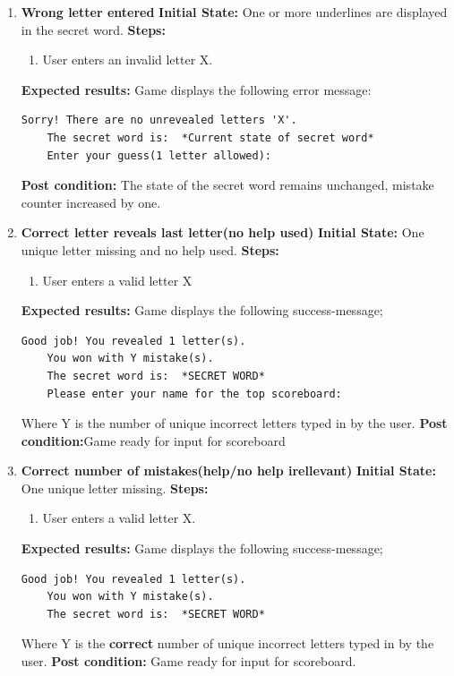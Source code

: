 \documentclass{article}
\begin{document}
{\begin{enumerate}
	\item \textbf{Wrong letter entered}\newline
	\textbf{Initial State:} One or more underlines are displayed in the secret word.\newline
	\textbf{Steps:}
	\begin{enumerate}
	\item User enters an invalid letter X.
	\end{enumerate}
	\textbf{Expected results:} Game displays the following error message: 
	\begin{lstlisting}[breaklines, gobble=8]
	Sorry! There are no unrevealed letters 'X'. 
	The secret word is:  *Current state of secret word*
	Enter your guess(1 letter allowed):
	\end{lstlisting}
	\textbf{Post condition:} The state of the secret word remains unchanged, mistake counter increased by one.

	\item \textbf{Correct letter reveals last letter(no help used)}\newline
	\textbf{Initial State:} One unique letter missing and no help used.\newline
	\textbf{Steps:}
	\begin{enumerate}
	\item User enters a valid letter X
	\end{enumerate}
	\textbf{Expected results:} Game displays the following success-message;
	\begin{lstlisting}[breaklines, gobble=8]
	Good job! You revealed 1 letter(s).
	You won with Y mistake(s).
	The secret word is:  *SECRET WORD*
	Please enter your name for the top scoreboard:
	\end{lstlisting}
	Where Y is the number of unique incorrect letters typed in by the user.\newline
	\textbf{Post condition:}Game ready for input for scoreboard\newline
	
	\item \textbf{Correct number of mistakes(help/no help irellevant)}\newline
	\textbf{Initial State:} One unique letter missing.\newline
	\textbf{Steps:}
	\begin{enumerate}
	\item User enters a valid letter X.
	\end{enumerate}
	\textbf{Expected results:} Game displays the following success-message;
	\begin{lstlisting}[breaklines, gobble=8]
	Good job! You revealed 1 letter(s).
	You won with Y mistake(s).
	The secret word is:  *SECRET WORD*
	\end{lstlisting}
	Where Y is the \textbf{correct} number of unique incorrect letters typed in by the user.\newline
	\textbf{Post condition:} Game ready for input for scoreboard.


\end{enumerate}}
\end{document}

